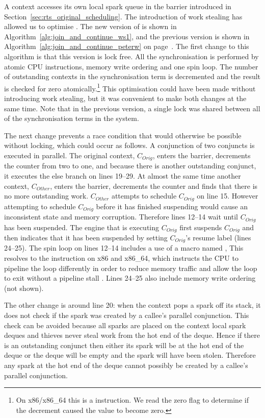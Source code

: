 A context accesses its own local spark queue in the \joinandcontinue barrier
introduced in Section~\ref{sec:rts_original_scheduling}.
The introduction of work stealing has allowed us to optimise
\joinandcontinue.
The new version of \joinandcontinue is shown in
Algorithm~\ref{alg:join_and_continue_ws1}, and
the previous version is shown in
Algorithm~\ref{alg:join_and_continue_peterw}
on page~\pageref{alg:join_and_continue_peterw}.
The first change to this algorithm
is that this version is lock free.
All the synchronisation is performed by atomic CPU instructions, memory
write ordering and one spin loop.
The number of outstanding contexts in the synchronisation term is
decremented and the result is checked for zero atomically.\footnote{
    On x86/x86\_64 this is a  instruction.
    We read the zero flag to determine if the decrement caused the value to
    become zero.}
This optimisation could have been made without introducing work stealing,
but it was convenient to make both changes at the same time.
Note that in the previous version, a single lock was shared between all of
the synchronisation terms in the system.

The next change prevents a race condition that would otherwise be possible
without locking, which could occur as follows.
A conjunction of two conjuncts is executed in parallel.
The original context, $C_{Orig}$,
enters the barrier, decrements the counter from two to one,
and because there is another outstanding conjunct,
it executes the else branch on lines 19--29.
At almost the same time another context, $C_{Other}$,
enters the barrier, decrements the counter and finds that there is no more
outstanding work.
$C_{Other}$ attempts to schedule $C_{Orig}$ on line 15.
However attempting to schedule $C_{Orig}$ before it has finished suspending
would cause an inconsistent state and memory corruption.
Therefore lines 12--14 wait until $C_{Orig}$ has been suspended.
The engine that is executing $C_{Orig}$ first suspends $C_{Orig}$ and then
indicates that it has been suspended by setting $C_{Orig}$'s resume label
(lines 24--25).
The spin loop on lines 12--14 includes a use of a macro named
,
This resolves to the  instruction on x86 and x86\_64,
which instructs the CPU to pipeline the loop differently in order to reduce
memory traffic and allow the loop to exit without a pipeline stall
\citep{intel:pause}.
Lines 24--25 also include memory write ordering (not shown).

The other change is around line 20:
when the context pops a spark off its stack, it does not check if the spark
was created by a callee's parallel conjunction.
This check can be avoided
because all sparks are placed on the context local spark deques and
thieves never steal work from the hot end of the deque.
Hence if there is an outstanding conjunct then either
its spark will be at the hot end of the deque
or the deque will be empty and the spark will have been stolen.
Therefore any spark at the hot end of the deque cannot possibly be created
by a callee's parallel conjunction.

